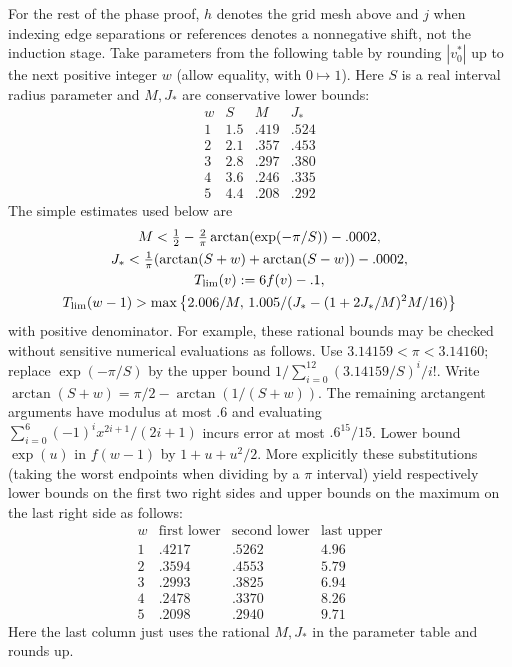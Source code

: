 \documentclass[11pt]{article}
\begin{document}
For the rest of the phase proof, \(h\) denotes the grid mesh above and \(j\) when indexing edge separations or references denotes a nonnegative shift, not the induction stage. Take parameters from the following table by rounding \(|v_0^*|\) up to the next positive integer \(w\) (allow equality, with \(0\mapsto1\)). Here \(S\) is a real interval radius parameter and \(M,J_*\) are conservative lower bounds:
\[
\begin{array}{c|ccc}
w&S&M&J_*\\\hline
1&1.5&.419&.524\\
2&2.1&.357&.453\\
3&2.8&.297&.380\\
4&3.6&.246&.335\\
5&4.4&.208&.292
\end{array}
\]
The simple estimates used below are
\[
\begin{gathered}
 M< \tfrac12-\tfrac2\pi \arctan(\exp(-\pi/S))-.0002,\\
 J_* < \tfrac1\pi(\arctan(S+w)+\arctan(S-w))-.0002,\\
 T_{\rm lim}(v):=6 f(v)-.1,\\
 T_{\rm lim}(w-1)> \max\left\{2.006/M,\,1.005/(J_*-(1+2J_*/M)^2 M/16)\right\}
\end{gathered}
\]
with positive denominator. For example, these rational bounds may be checked without sensitive numerical evaluations as follows. Use \(3.14159<\pi<3.14160\); replace \(\exp(-\pi/S)\) by the upper bound \(1/\sum_{i=0}^{12}(3.14159/S)^i/i!\). Write \(\arctan(S+w)=\pi/2-\arctan(1/(S+w))\). The remaining arctangent arguments have modulus at most \(.6\) and evaluating \(\sum_{i=0}^6(-1)^i x^{2i+1}/(2i+1)\) incurs error at most \(.6^{15}/15\). Lower bound \(\exp(u)\) in \(f(w-1)\) by \(1+u+u^2/2\). More explicitly these substitutions (taking the worst endpoints when dividing by a $\pi$ interval) yield respectively lower bounds on the first two right sides and upper bounds on the maximum on the last right side as follows:
\[
\begin{array}{c|ccc}
w &\text{first lower}&\text{second lower}&\text{last upper}\\\hline
1&.4217&.5262&4.96\\
2&.3594&.4553&5.79\\
3&.2993&.3825&6.94\\
4&.2478&.3370&8.26\\
5&.2098&.2940&9.71
\end{array}
\]
Here the last column just uses the rational $M,J_*$ in the parameter table and rounds up.
\end{document}
